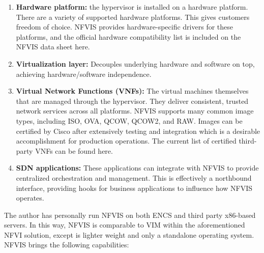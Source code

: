 \begin{enumerate}
  \item \textbf{Hardware platform:} the hypervisor is installed on a hardware
  platform. There are a variety of supported hardware platforms. This gives customers
  freedom of choice. NFVIS provides hardware-specific drivers for these
  platforms, and the official hardware compatibility list is included on the
  NFVIS data sheet here.
  \item \textbf{Virtualization layer:} Decouples underlying hardware and
  software on top, achieving hardware/software independence.
  \item \textbf{Virtual Network Functions (VNFs):} The virtual machines themselves
  that are managed through the hypervisor. They deliver consistent, trusted network
  services across all platforms. NFVIS supports many common image types,
  including ISO, OVA, QCOW, QCOW2, and RAW. Images can be certified by Cisco
  after extensively testing and integration which is a desirable accomplishment
  for production operations. The current list of certified third-party VNFs can
  be found here.
  \item \textbf{SDN applications:} These applications can integrate with NFVIS to
  provide centralized orchestration and management. This is effectively a
  northbound interface, providing hooks for business applications to influence
  how NFVIS operates.
\end{enumerate}

The author has personally run NFVIS on both ENCS and third party x86-based
servers. In this way, NFVIS is comparable to VIM within the aforementioned
NFVI solution, except is lighter weight and only a standalone operating
system. NFVIS brings the following capabilities:

